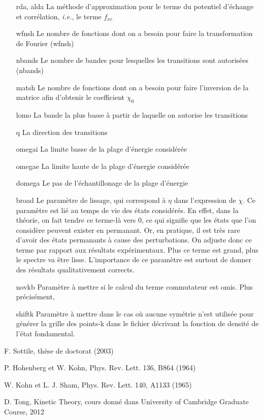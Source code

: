 \documentclass[12pt, french]{report}
\theoremstyle{theoreme}
\begin{document}
\begin{itemize}
\item[rda, alda] La méthode d'approximation pour le terme du potentiel d'échange et corrélation, \textit{i.e.}, le terme $f_{xc}$ %
\item[wfnsh] Le nombre de fonctions dont on a besoin pour faire la transformation de Fourier (wfnsh)%
\item[nbands] Le nombre de bandes pour lesquelles les transitions sont autorisées (nbands)
\item[matsh] Le nombre de fonctions dont on a besoin pour faire l'inversion de la matrice afin d'obtenir le coefficient $\chi_0$
\item[lomo] La bande la plus basse à partir de laquelle on autorise les transitions
\item[q] La direction des transitions
\item[omegai] La limite basse de la plage d'énergie considérée
\item[omegae] La limite haute de la plage d'énergie considérée
\item[domega] Le pas de l'échantillonage de la plage d'énergie
\item[broad] Le paramètre de lissage, qui correspond à $\eta$ dans l'expression de $\chi$. Ce paramètre est lié au temps de vie des états considérés. En effet, dans la théorie, on fait tendre ce terme-là vers 0, ce qui signifie que les états que l'on considère peuvent exister en permanant. Or, en pratique, il est très rare d'avoir des états permanants à cause des perturbations. On adjuste donc ce terme par rapport aux résultats expérimentaux. Plus ce terme est grand, plus le spectre va être lisse. L'importance de ce paramètre est surtout de donner des résultats qualitativement corrects.
\item[novkb] Paramètre à mettre si le calcul du terme commutateur est omis. Plus précisément, %
\item[shiftk] Paramètre à mettre dans le cas où aucune symétrie n'est utilisée pour générer la grille des points-k dans le fichier décrivant la fonction de densité de l'état fondamental.
\end{itemize}

\begin{thebibliography}{9}

    F. Sottile, thèse de doctorat (2003)

    P. Hohenberg et W. Kohn, Phys. Rev. Lett. 136, B864 (1964)

    W. Kohn et L. J. Sham, Phys. Rev. Lett. 140, A1133 (1965)

    D. Tong, Kinetic Theory, cours donné dans University of Cambridge Graduate Course, 2012

\end{thebibliography}
\end{document}
